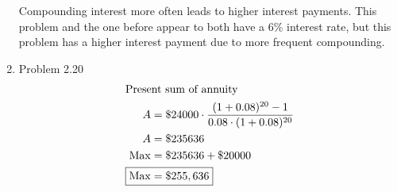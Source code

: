 \documentclass[12pt]{article}
\begin{document}
\begin{enumerate}
    Compounding interest more often leads to higher interest payments. This problem and the one before appear to both have a 6\% interest rate, but this problem has a higher interest payment due to more frequent compounding.

    \item Problem 2.20
    \begin{align*}
        \intertext{Present sum of annuity}
        A &= \$24000 \cdot \frac{(1 + 0.08)^{20} - 1}{0.08 \cdot (1 + 0.08)^{20}} \\
        A &= \$235636 \\
        \mathrm{Max} &= \$235636 + \$20000 \\
        \Aboxed{\mathrm{Max} &= \$255,636}
    \end{align*}



\end{enumerate}
\end{document}
